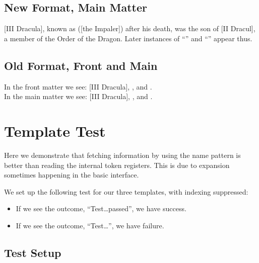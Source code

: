 \documentclass[oneside]{article}
\begin{document}
\subsection{New Format, Main Matter}
\NamesActive

[III Dracula], known as
\SubvertThis{}
([the Impaler])
after his death, was the son of [II Dracul],
a member of the Order of the Dragon. Later instances of
``'' and ``'' appear thus.

\let\NamesFormat\OldFormat
\let\FrontNamesFormat\OldFrontNames

\subsection{Old Format, Front and Main}

\NamesInactive In the front matter we see:
\ForgetThis{}[III Dracula],
, and  .\\

\NamesActive\noindent In the main matter we see:
\ForgetThis{}[III Dracula],
, and  .

%
%

\section{Template Test}

Here we demonstrate that fetching information by using the name pattern is better than reading the internal token registers. This is due to expansion sometimes happening in the basic interface.

We set up the following test for our three templates, with indexing suppressed:

\begin{itemize}
  \item If we see the outcome, ``Test\dots passed'', we have success.
  \item If we see the outcome, ``Test\dots'', we have failure.
\end{itemize}

\subsection{Test Setup}
\end{document}
